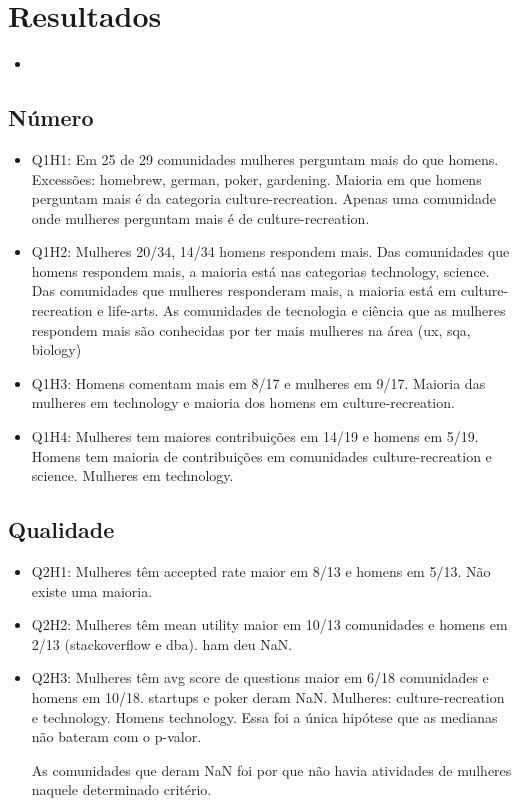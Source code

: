 \chapter{Resultados}

\begin{itemize}
	\item 
\end{itemize}

\section{Número} %
\label{sec:numero}

\begin{itemize}
	\item Q1H1: Em 25 de 29 comunidades mulheres perguntam mais do que homens. Excessões: homebrew, german, poker, gardening. Maioria em que homens perguntam mais é da categoria culture-recreation. Apenas uma comunidade onde mulheres perguntam mais é de culture-recreation.
	\item Q1H2: Mulheres 20/34, 14/34 homens respondem mais. Das comunidades que homens respondem mais, a maioria está nas categorias technology, science. Das comunidades que mulheres responderam mais, a maioria está em culture-recreation e life-arts. As comunidades de tecnologia e ciência que as mulheres respondem mais são conhecidas por ter mais mulheres na área (ux, sqa, biology)
	\item Q1H3: Homens comentam mais em 8/17 e mulheres em 9/17. Maioria das mulheres em technology e maioria dos homens em culture-recreation.
	\item Q1H4: Mulheres tem maiores contribuições em 14/19 e homens em 5/19. Homens tem maioria de contribuições em comunidades culture-recreation e science. Mulheres em technology.
\end{itemize}


\section{Qualidade} %
\label{sec:qualidade}

\begin{itemize}
	\item Q2H1: Mulheres têm accepted rate maior em 8/13 e homens em 5/13.  Não existe uma maioria.
	\item Q2H2: Mulheres têm mean utility maior em 10/13 comunidades e homens em 2/13 (stackoverflow e dba). ham deu NaN.
	\item Q2H3: Mulheres têm avg score de questions maior em 6/18 comunidades e homens em 10/18. startups e poker deram NaN. Mulheres: culture-recreation e technology. Homens technology. Essa foi a única hipótese que as medianas não bateram com o p-valor.

As comunidades que deram NaN foi por que não havia atividades de mulheres naquele determinado critério.

\end{itemize}

